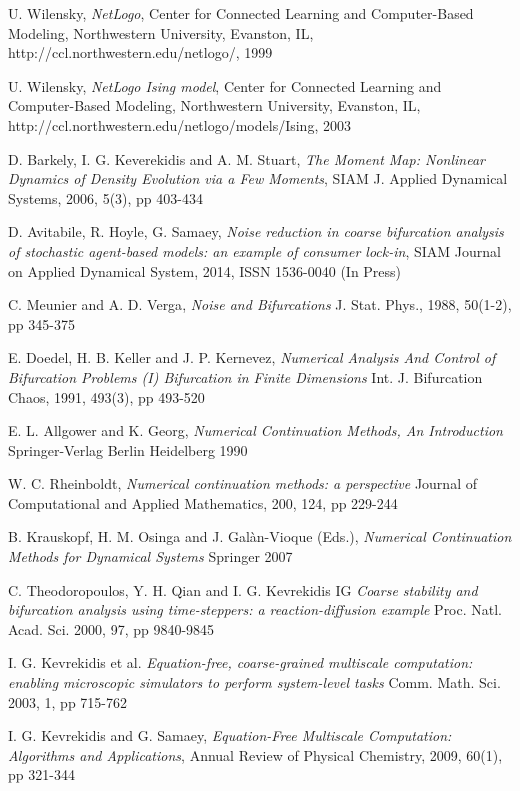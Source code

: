 \documentclass[11pt]{article}
\begin{document}
 
\begin{thebibliography}{10}  

{\sc U. Wilensky}, 
{\it NetLogo},
Center for Connected Learning and Computer-Based Modeling, Northwestern University, Evanston, IL,
http://ccl.northwestern.edu/netlogo/,
1999

{\sc U. Wilensky}, 
{\it NetLogo Ising model},
Center for Connected Learning and Computer-Based Modeling, Northwestern University, Evanston, IL,
http://ccl.northwestern.edu/netlogo/models/Ising,
2003

{\sc D. Barkely, I. G. Keverekidis and A. M. Stuart},
{\it The Moment Map: Nonlinear Dynamics of Density Evolution via a Few Moments},
SIAM J. Applied Dynamical Systems, 2006, 5(3), pp 403-434

{\sc D. Avitabile, R. Hoyle, G. Samaey},
{\it Noise reduction in coarse bifurcation analysis of stochastic agent-based models: an example of consumer lock-in},
SIAM Journal on Applied Dynamical System, 2014, ISSN 1536-0040 (In Press)

{\sc C. Meunier and A. D. Verga},
{\it Noise and Bifurcations}
J. Stat. Phys., 1988, 50(1-2), pp 345-375

{\sc E. Doedel, H. B. Keller and J. P. Kernevez},
{\it Numerical Analysis And Control of Bifurcation Problems (I) Bifurcation in Finite Dimensions}
Int. J. Bifurcation Chaos, 1991, 493(3), pp 493-520

{\sc E. L. Allgower and K. Georg},
{\it Numerical Continuation Methods, An Introduction}
Springer-Verlag Berlin Heidelberg 1990

{\sc W. C. Rheinboldt},
{\it Numerical continuation methods: a perspective}
Journal of Computational and Applied Mathematics, 200, 124, pp 229-244

{\sc B. Krauskopf, H. M. Osinga and J. Gal\`{a}n-Vioque (Eds.)},
{\it Numerical Continuation Methods for Dynamical Systems}
Springer 2007

{\sc C. Theodoropoulos, Y. H. Qian and I. G. Kevrekidis IG}
{\it Coarse stability and bifurcation analysis using time-steppers: a reaction-diffusion example}
Proc. Natl. Acad. Sci. 2000, 97, pp 9840-9845

{\sc I. G. Kevrekidis et al.} 
{\it Equation-free, coarse-grained multiscale computation: enabling microscopic simulators to perform system-level tasks}
Comm. Math. Sci. 2003, 1, pp 715-762 

{\sc I. G. Kevrekidis and G. Samaey},
{\it Equation-Free Multiscale Computation: Algorithms and Applications},
Annual Review of Physical Chemistry, 2009, 60(1), pp 321-344




\end{thebibliography} 
\end{document}
